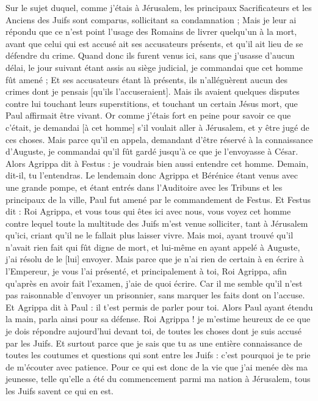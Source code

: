 \begin{multicols}{2}
Sur le sujet duquel, comme j'étais à Jérusalem, les principaux Sacrificateurs et les Anciens des Juifs sont comparus, sollicitant sa condamnation ;
Mais je leur ai répondu que ce n'est point l'usage des Romains de livrer quelqu'un à la mort, avant que celui qui est accusé ait ses accusateurs présents, et qu'il ait lieu de se défendre du crime.
Quand donc ils furent venus ici, sans que j'usasse d'aucun délai, le jour suivant étant assis au siège judicial, je commandai que cet homme fût amené ;
Et ses accusateurs étant là présents, ils n'alléguèrent aucun des crimes dont je pensais [qu'ils l'accuseraient].
Mais ils avaient quelques disputes contre lui touchant leurs superstitions, et touchant un certain Jésus mort, que Paul affirmait être vivant.
Or comme j'étais fort en peine pour savoir ce que c'était, je demandai [à cet homme] s'il voulait aller à Jérusalem, et y être jugé de ces choses.
Mais parce qu'il en appela, demandant d'être réservé à la connaissance d'Auguste, je commandai qu'il fût gardé jusqu'à ce que je l'envoyasse à César.
Alors Agrippa dit à Festus : je voudrais bien aussi entendre cet homme. Demain, dit-il, tu l'entendras.
Le lendemain donc Agrippa et Bérénice étant venus avec une grande pompe, et étant entrés dans l'Auditoire avec les Tribuns et les principaux de la ville, Paul fut amené par le commandement de Festus.
Et Festus dit : Roi Agrippa, et vous tous qui êtes ici avec nous, vous voyez cet homme contre lequel toute la multitude des Juifs m'est venue solliciter, tant à Jérusalem qu'ici, criant qu'il ne le fallait plus laisser vivre.
Mais moi, ayant trouvé qu'il n'avait rien fait qui fût digne de mort, et lui-même en ayant appelé à Auguste, j'ai résolu de le [lui] envoyer.
Mais parce que je n'ai rien de certain à en écrire à l'Empereur, je vous l'ai présenté, et principalement à toi, Roi Agrippa, afin qu'après en avoir fait l'examen, j'aie de quoi écrire.
Car il me semble qu'il n'est pas raisonnable d'envoyer un prisonnier, sans marquer les faits dont on l'accuse.
\VerseOne{}Et Agrippa dit à Paul : il t'est permis de parler pour toi. Alors Paul ayant étendu la main, parla ainsi pour sa défense.
Roi Agrippa ! je m'estime heureux de ce que je dois répondre aujourd'hui devant toi, de toutes les choses dont je suis accusé par les Juifs.
Et surtout parce que je sais que tu as une entière connaissance de toutes les coutumes et questions qui sont entre les Juifs : c'est pourquoi je te prie de m'écouter avec patience.
Pour ce qui est donc de la vie que j'ai menée dès ma jeunesse, telle qu'elle a été du commencement parmi ma nation à Jérusalem, tous les Juifs savent ce qui en est.

\end{multicols}
